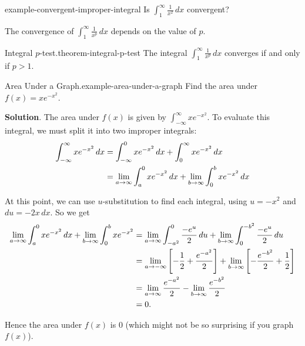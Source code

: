 \documentclass[10pt,]{book}
\numberwithin{equation}{section}
\newcommand{\gt}{>}
\begin{document}
\begin{example}{}{example-convergent-improper-integral}%
\hypertarget{p-585}{}%
Is \(\int_{1}^{\infty}\frac{1}{x^{2}}\,dx\) convergent?%
\end{example}
\hypertarget{p-586}{}%
The convergence of \(\int_{1}^{\infty}\frac{1}{x^{p}}\,dx\) depends on the value of \(p\).%
\begin{theorem}{Integral \(p\)-test.}{}{theorem-integral-p-test}%
\hypertarget{p-587}{}%
The integral \(\int_{1}^{\infty}\frac{1}{x^{p}}\,dx\) converges if and only if \(p \gt 1\).%
\end{theorem}
\begin{example}{Area Under a Graph.}{example-area-under-a-graph}%
\hypertarget{p-588}{}%
Find the area under \(f(x) = xe^{-x^{2}}\).%
\par\smallskip%
\noindent\textbf{Solution}.\hypertarget{solution-127}{}\quad%
\hypertarget{p-589}{}%
The area under \(f(x)\) is given by \(\int_{-\infty}^{\infty}xe^{-x^{2}}\). To evaluate this integral, we must split it into two improper integrals:%
\begin{align*}
\int_{-\infty}^{\infty}xe^{-x^{2}}\,dx & = \int_{-\infty}^{0}xe^{-x^{2}}\,dx + \int_{0}^{\infty}xe^{-x^{2}}\,dx \\
& = \lim_{a\to\-\infty}\int_{a}^{0}xe^{-x^{2}}\,dx + \lim_{b\to\infty}\int_{0}^{b}xe^{-x^{2}}\,dx 
\end{align*}
%
\par
\hypertarget{p-590}{}%
At this point, we can use \(u\)-substitution to find each integral, using \(u = -x^{2}\) and \(du = -2x\,dx\). So we get%
\begin{align*}
\lim_{a\to\-\infty}\int_{a}^{0}xe^{-x^{2}}\,dx + \lim_{b\to\infty}\int_{0}^{b}xe^{-x^{2}} & = \lim_{a\to\-\infty}\int_{-a^{2}}^{0}\frac{-e^{u}}{2}\,du + \lim_{b\to\infty}\int_{0}^{-b^{2}}\frac{-e^{u}}{2}\,du \\
& = \lim_{a\to-\infty}\left[-\frac{1}{2} + \frac{e^{-a^{2}}}{2}\right] + \lim_{b\to\infty}\left[-\frac{e^{-b^{2}}}{2} + \frac{1}{2}\right]\\
& = \lim_{a\to\infty}\frac{e^{-a^{2}}}{2} - \lim_{b\to\infty}\frac{e^{-b^{2}}}{2} \\
& = 0. 
\end{align*}
%
\par
\hypertarget{p-591}{}%
Hence the area under \(f(x)\) is \(0\) (which might not be so surprising if you graph \(f(x)\)).%
\end{example}
\end{document}
